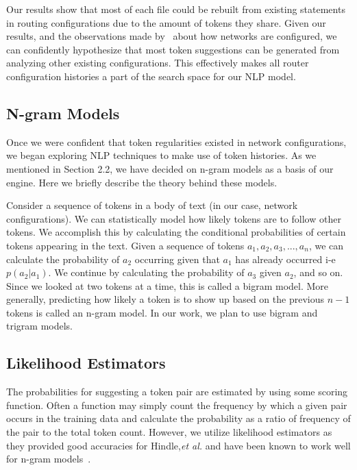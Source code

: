 Our results show that most of each file could be rebuilt from existing statements in routing configurations due to the amount of tokens they share. Given our results, and the observations made by~\cite{complexity} about how networks are configured, we can confidently hypothesize that most token suggestions can be generated from analyzing other existing configurations. This effectively makes all router configuration histories a part of the search space for our NLP model. 

\subsection{N-gram Models}

Once we were confident that token regularities existed in network configurations, we began exploring NLP techniques to make use of token histories. As we mentioned in Section 2.2, we have decided on n-gram models as a basis of our engine. Here we briefly describe the theory behind these models. 

Consider a sequence of tokens in a body of text (in our case, network configurations). We can statistically model how likely tokens are to follow other tokens. We accomplish this by calculating the conditional probabilities of certain tokens appearing in the text. Given a sequence of tokens $a_1,a_2,a_3,...,a_n$, we can calculate the probability of $a_2$ occurring given that $a_1$ has already occurred i-e $p(a_2 | a_1)$. We continue by calculating the probability of $a_3$ given $a_2$, and so on. Since we looked at two tokens at a time, this is called a bigram model. More generally, predicting how likely a token is to show up based on the previous $n-1$ tokens is called an n-gram model. In our work, we plan to use bigram and trigram models.

\subsection{Likelihood Estimators} 

The probabilities for suggesting a token pair are estimated by using some scoring function. Often a function may simply count the frequency by which a given pair occurs in the training data and calculate the probability as a ratio of frequency of the pair to the total token count. However, we utilize likelihood estimators as they provided good accuracies for Hindle,\textit{et al.} and have been known to work well for n-gram models~\cite{manning}.

